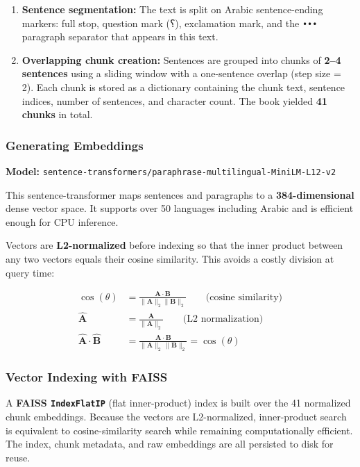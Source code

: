 \begin{enumerate}
  \item \textbf{Sentence segmentation:} The text is split on Arabic sentence-ending markers: full stop, question mark (\textarabic{؟}), exclamation mark, and the \texttt{•••} paragraph separator that appears in this text.

  \item \textbf{Overlapping chunk creation:} Sentences are grouped into chunks of \textbf{2--4 sentences} using a sliding window with a one-sentence overlap (step size = 2). Each chunk is stored as a dictionary containing the chunk text, sentence indices, number of sentences, and character count. The book yielded \textbf{41 chunks} in total.
\end{enumerate}

\subsubsection{Generating Embeddings}

\noindent\textbf{Model:} \texttt{sentence-transformers/paraphrase-multilingual-MiniLM-L12-v2}

\medskip
This sentence-transformer maps sentences and paragraphs to a \textbf{384-dimensional} dense vector space. It supports over 50 languages including Arabic and is efficient enough for CPU inference.

\medskip
Vectors are \textbf{L2-normalized} before indexing so that the inner product between any two vectors equals their cosine similarity. This avoids a costly division at query time:

\begin{align}
  \cos(\theta) &= \frac{\mathbf{A} \cdot \mathbf{B}}{\|\mathbf{A}\|_2 \|\mathbf{B}\|_2}
  \qquad \text{(cosine similarity)} \\[6pt]
  \hat{\mathbf{A}} &= \frac{\mathbf{A}}{\|\mathbf{A}\|_2}
  \qquad \text{(L2 normalization)} \\[6pt]
  \hat{\mathbf{A}} \cdot \hat{\mathbf{B}} &= \frac{\mathbf{A} \cdot \mathbf{B}}{\|\mathbf{A}\|_2\,\|\mathbf{B}\|_2} = \cos(\theta)
\end{align}

\subsubsection{Vector Indexing with FAISS}

A \textbf{FAISS \texttt{IndexFlatIP}} (flat inner-product) index is built over the 41 normalized chunk embeddings. Because the vectors are L2-normalized, inner-product search is equivalent to cosine-similarity search while remaining computationally efficient. The index, chunk metadata, and raw embeddings are all persisted to disk for reuse.

